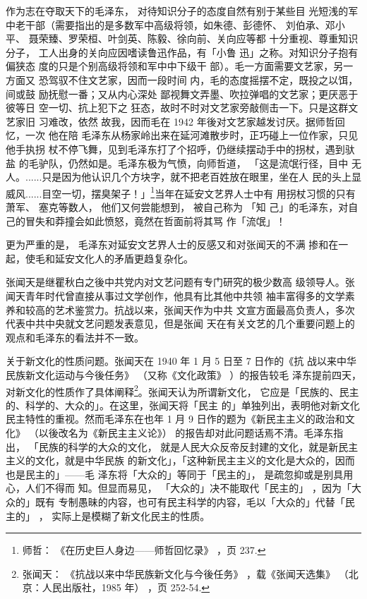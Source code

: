 作为志在夺取天下的毛泽东， 对待知识分子的态度自然有别于某些目 光短浅的军
中老干部（需要指出的是多数军中高级将领，如朱德、彭德怀、 刘伯承、邓小平、
聂荣臻、罗荣桓、叶剑英、陈毅、徐向前、关向应等都 十分重视、尊重知识分子，
工人出身的关向应因嗜读鲁迅作品，有「小鲁 迅」之称。对知识分子抱有偏狭态
度的只是个别高级将领和军中中下级干 部）。毛一方面需要文艺家，另一方面又
恐驾驭不住文艺家，因而一段时间 内，毛的态度摇摆不定，既投之以饵，间或鼓
励抚慰一番；又从内心深处 鄙视舞文弄墨、吹拉弹唱的文艺家；更厌恶于彼等日
空一切、抗上犯下之 狂态，故时不时对文艺家旁敲侧击一下。只是这群文艺家旧
习难改，依然 故我，因而毛在 1942 年後对文艺家越发讨厌。据师哲回忆，一次
他在陪 毛泽东从杨家岭出来在延河滩散步时，正巧碰上一位作家，只见他手执拐
杖不停飞舞，见到毛泽东打了个招呼，仍继续摆动手中的拐杖，遇到驮盐
的毛驴队，仍然如是。毛泽东极为气愤，向师哲道，
「这是流氓行径，目中
无人。......只是因为他认识几个方块字，就不把老百姓放在眼里，坐在人
民的头上显威风......目空一切，摆臭架子！」\footnote{师哲：
《在历史巨人身边——师哲回忆录》
，页 237.}当年在延安文艺界人士中有
用拐杖习惯的只有萧军、
塞克等数人，
他们又何尝能想到，
被自己称为
「知
己」的毛泽东，对自己的冒失和莽撞会如此愤怒，竟然在哲面前将其骂
作「流氓」！

更为严重的是，
毛泽东对延安文艺界人士的反感又和对张闻天的不满
掺和在一起，使毛和延安文化人的矛盾更趋复杂化。

张闻天是继瞿秋白之後中共党内对文艺问题有专门研究的极少数高
级领导人。张闻天青年时代曾直接从事过文学创作，他具有比其他中共领
袖丰富得多的文学素养和较高的艺术鉴赏力。抗战以来，张闻天作为中共
文宣方面最高负责人，多次代表中共中央就文艺问题发表意见，但是张闻
天在有关文艺的几个重要问题上的观点和毛泽东的看法并不一致。

关于新文化的性质问题。张闻天在 1940 年 1 月 5 日至 7 日作的《抗
战以来中华民族新文化运动与今後任务》
（又称《文化政策》
）的报告较毛
泽东提前四天，对新文化的性质作了具体阐释\footnote{张闻天：
《抗战以来中华民族新文化与今後任务》
，载《张闻天选集》
（北京：人民出版社，1985 年）
，页 252-54.}。张闻天认为所谓新文化，
它应是「民族的、民主的、科学的、大众的」。在这里，张闻天将「民主
的」单独列出，表明他对新文化民主特性的重视。然而毛泽东在也年 1 月
9 日作的题为《新民主主义的政治和文化》
（以後改名为《新民主主义论》）
的报告却对此问题话焉不清。毛泽东指出，
「民族的科学的大众的文化，
就是人民大众反帝反封建的文化，就是新民主主义的文化，就是中华民族
的新文化」，「这种新民主主义的文化是大众的，因而也是民主的」——毛
泽东将「大众的」等同于「民主的」，
是疏忽抑或是别具用心，人们不得而
知。但显而易见，
「大众的」决不能取代「民主的」
，因为「大众的」既有
专制愚昧的内容，也可有民主科学的内容，毛以「大众的」代替「民主的」
，
实际上是模糊了新文化民主的性质。

